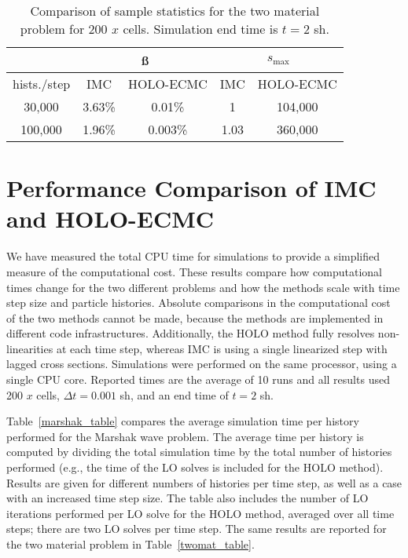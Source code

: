 \begin{table}[H]
\centering
\caption{\label{twomat_var} {Comparison of sample statistics for the
    two material problem for 200 $x$ cells.   Simulation end time is ${t=2}$ sh.}}
\vspace{-0.1in}
\begin{tabular}{|c|cc|cc|}\cline{2-5}
    \multicolumn{1}{c|}{}       & \multicolumn{2}{|c|}{\ss} & \multicolumn{2}{|c|}{$s_{\max}$} \\ \hline
hists./step     & IMC & HOLO-ECMC  &  IMC & HOLO-ECMC   \\ \hline
   30,000	    & 3.63\%  & 0.01\% &  1      &   104,000      \\
  100,000       & 1.96\%  & 0.003\% & 1.03   &   360,000      \\ \hline
\end{tabular}
\end{table}

\section{Performance Comparison of IMC and HOLO-ECMC}
\label{timing}

We have measured the total CPU time for simulations to provide a simplified measure of the
computational cost.  These results compare how computational times change for the two
different problems and how the methods scale with time step size and particle histories.  Absolute comparisons in the computational cost of the two
methods cannot be made, because the methods are implemented
in different code infrastructures. Additionally, the HOLO method fully resolves
non-linearities at each time step, whereas IMC is using a single linearized step with
lagged cross sections. Simulations were performed on the same processor, using a single CPU
core.  Reported times are the average of 10 runs and all results used 200 $x$ cells,
$\Delta t = 0.001$ sh, and an end time of $t=2$ sh.

Table~\ref{marshak_table} compares the average
simulation time per history performed for the Marshak wave problem.  The average time per history is computed by dividing the total simulation time by
the total number of histories performed (e.g., the time of the LO solves is included for
the HOLO method).  Results are given for different numbers of histories per time step, as
well as a case with an increased time step size.  The table also includes the number of LO
iterations performed per LO solve for the HOLO method, averaged over all time steps;
there are two LO solves per time step.  The same results are reported for the two
material problem in Table~\ref{twomat_table}.

